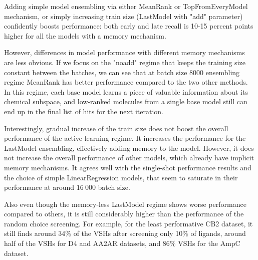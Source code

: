 Adding simple model ensembling via either MeanRank or TopFromEveryModel mechanism, or simply increasing train size (LastModel with "add" parameter) confidently boosts performance: both early and late recall is 10-15 percent points higher for all the models with a memory mechanism.

However, differences in model performance with different memory mechanisms are less obvious. If we focus on the "noadd" regime that keeps the training size constant between the batches, we can see that at batch size 8000  ensembling regime MeanRank has better performance compared to the two other methods. In this regime, each base model learns a piece of valuable information about its chemical subspace, and low-ranked molecules from a single base model still can end up in the final list of hits for the next iteration.

Interestingly, gradual increase of the train size does not boost the overall performance of the active learning regime. It increases the performance for the LastModel ensembling, effectively adding memory to the model. However, it does not increase the overall performance of other models, which already have implicit memory mechanisms. It agrees well with the single-shot performance results and the choice of simple LinearRegression models, that seem to saturate in their performance at around $16\ 000$ batch size.

Also even though the memory-less LastModel regime shows worse performance compared to others, it is still considerably higher than the performance of the random choice screening. For example, for the least performative CB2 dataset, it still finds around 34\% of the VSHs after screening only 10\% of ligands, around half of the VSHs for D4 and AA2AR datasets, and 86\% VSHs for the AmpC dataset.
